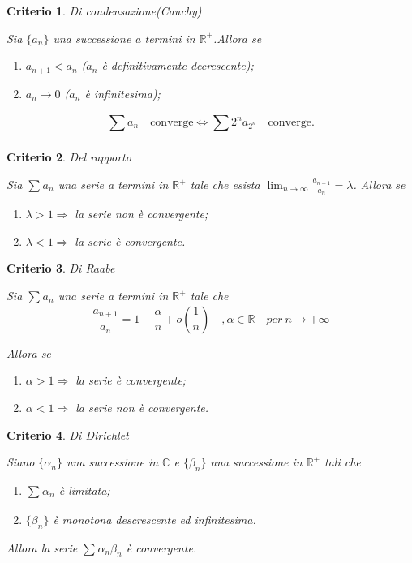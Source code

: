 \documentclass[a4paper, titlepage]{report}%
\theoremstyle{definition} %
\theoremstyle{plain}
\theoremstyle{plain}
\theoremstyle{remark}
\theoremstyle{remark}
\theoremstyle{plain}
\newtheorem*{criterio}{Criterio}
\theoremstyle{plain}
\theoremstyle{plain}
\theoremstyle{plain}
\theoremstyle{plain}
\begin{document}
\begin{criterio}{Di condensazione(Cauchy)}

    Sia $\{a_n\}$ una successione a termini in $\mathbb{R}^+$.Allora se
  \begin{enumerate}
    \item $a_{n+1}<a_n$ ($a_n $ è definitivamente decrescente);
    \item $a_n \rightarrow 0$ ($a_n$ è infinitesima);
  \end{enumerate}
\[
    \sum_{}^{}a_n \quad \text{converge}  \Longleftrightarrow \sum_{}^{}2^na_{2^n} 
    \quad \text{converge}.
\]
\end{criterio}
\begin{criterio}{Del rapporto}
    
    Sia $\sum_{}^{}a_n$ una serie a termini in $\mathbb{R}^+$ tale che
    esista $\lim_{n \to \infty} \frac{a_{n+1}}{a_n} = \lambda$.
    Allora se 
    \begin{enumerate}
        \item $\lambda>1 \Longrightarrow $ la serie non è convergente;
        \item $\lambda<1 \Longrightarrow $ la serie è convergente.
    \end{enumerate}
\end{criterio}
\begin{criterio}{Di Raabe}
    
    Sia $\sum_{}^{}a_n$ una serie a termini in $\mathbb{R}^+$ tale che
\[
        \frac{a_{n+1}}{a_n} = 1 - \frac{\alpha}{n} + o(\frac{1}{n}) 
        \quad , \alpha \in \mathbb{R} \quad per \ n \rightarrow +\infty
\]

    Allora se 
    \begin{enumerate}
        \item $\alpha>1 \Longrightarrow $ la serie è convergente;
        \item $\alpha<1 \Longrightarrow $ la serie non è convergente.
    \end{enumerate}
\end{criterio}
\begin{criterio}{Di Dirichlet}
    
    Siano $\{\alpha_n\}$ una successione in $\mathbb{C}$ e $\{ \beta_n\}$ una successione in $\mathbb{R}^+$ tali che
    \begin{enumerate}
        \item $\sum_{}^{}\alpha_n$ è limitata;
        \item $\{ \beta_n\}$ è monotona descrescente ed infinitesima.
    \end{enumerate}

    Allora la serie $\sum_{}^{}\alpha_n\beta_n$ è convergente.
\end{criterio}
    
\end{document}
